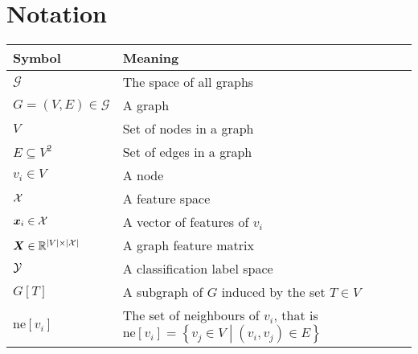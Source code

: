 \chapter*{Notation}

\begin{tabular}{ll}
	\toprule
	\textbf{Symbol} & \textbf{Meaning} \\
	\midrule
	\( \mathcal{G} \) & The space of all graphs \\
	\( G = \left( V, E \right) \in \mathcal{G} \) & A graph \\
	\( V \) & Set of nodes in a graph \\
	\( E \subseteq V^2 \) & Set of edges in a graph \\
	\( v_i \in V \) & A node \\
	\( \mathcal{X} \) & A feature space \\
	\( \bm{x}_i \in \mathcal{X} \) & A vector of features of \( v_i \) \\
	\( \bm{X} \in \mathbb{R}^{\left\lvert V \right\rvert \times \left\lvert \mathcal{X} \right\rvert} \) & A graph feature matrix	\\
	\( \mathcal{Y} \) & A classification label space \\
	\( G \left[ T \right] \) & A subgraph of \( G \) induced by the set \( T \in V \) \\
	\( \mathrm{ne}[v_i] \) & The set of neighbours of \( v_i \), that is \( \mathrm{ne}[v_i] = \left\{ v_j \in V \middle| \left( v_i, v_j \right) \in E \right\} \) \\
	\bottomrule
\end{tabular}
